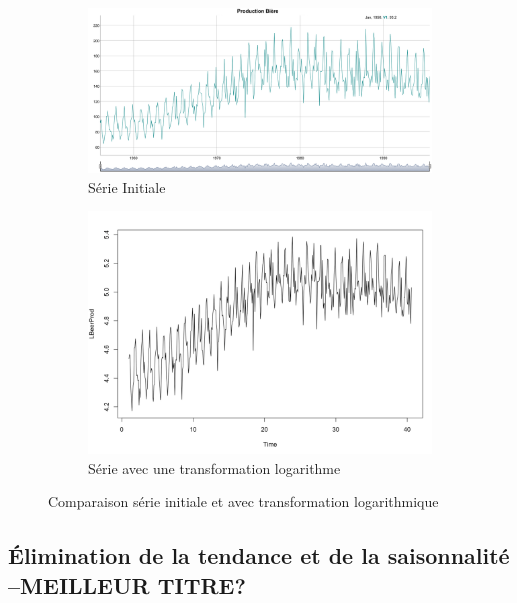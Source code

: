 \documentclass[12pt,a4paper]{book}
\newcommand{\1}{\mathds{1}}
\begin{document}
\begin{figure}[h]
	\begin{subfigure}{.5\textwidth}
  		\centering
    	\includegraphics[scale=0.2]{plot_beer}  
    	\caption{Série Initiale}
    	\label{fig:sub1}
    \end{subfigure}
    \begin{subfigure}{.5\textwidth}
    	\centering
    	\includegraphics[scale=0.3]{Log_Series}  
    	\caption{Série avec une transformation logarithme}
    	\label{fig:sub2}
    \end{subfigure}

\caption{Comparaison série initiale et avec transformation logarithmique}
\label{fig:1}
   
\end{figure}



\vspace{5 mm}
\subsection{Élimination de la tendance et de la saisonnalité --MEILLEUR TITRE?}
\end{document}
